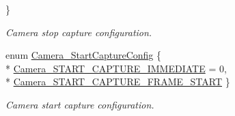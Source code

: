 \begin{DoxyCompactItemize}
 \}
\begin{DoxyCompactList}\small\item\em Camera stop capture configuration. \end{DoxyCompactList}\item 
enum \hyperlink{_camera_8h_a97037da7c87b817ddb71ec7100c69ca5}{Camera\+\_\+\+Start\+Capture\+Config} \{ \\*
\hyperlink{_camera_8h_a97037da7c87b817ddb71ec7100c69ca5a2e7b7db227fef9bf1d1083f1d167c3f0}{Camera\+\_\+\+S\+T\+A\+R\+T\+\_\+\+C\+A\+P\+T\+U\+R\+E\+\_\+\+I\+M\+M\+E\+D\+I\+A\+T\+E} = 0, 
\\*
\hyperlink{_camera_8h_a97037da7c87b817ddb71ec7100c69ca5a5f6f496192b849174e7b652df2ca1823}{Camera\+\_\+\+S\+T\+A\+R\+T\+\_\+\+C\+A\+P\+T\+U\+R\+E\+\_\+\+F\+R\+A\+M\+E\+\_\+\+S\+T\+A\+R\+T}
 \}
\begin{DoxyCompactList}\small\item\em Camera start capture configuration. \end{DoxyCompactList}\end{DoxyCompactItemize}

